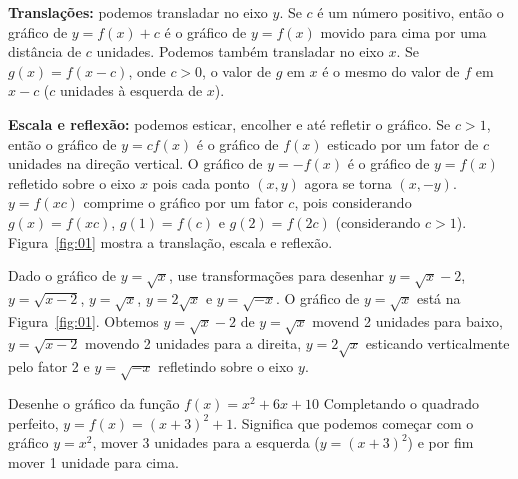 \textbf{Translações:} podemos transladar no eixo $y$. Se $c$ é um número positivo, então o gráfico de $y=f(x)+c$ é o gráfico de $y=f(x)$ movido para cima por uma distância de $c$ unidades. Podemos também transladar no eixo $x$. Se $g(x) = f(x-c)$, onde $c>0$, o valor de $g$ em $x$ é o mesmo do valor de $f$ em $x-c$ ($c$ unidades à esquerda de $x$).

\noindent\textbf{Escala e reflexão:} podemos esticar, encolher e até refletir o gráfico. Se $c > 1$, então o gráfico de $y=cf(x)$ é o gráfico de $f(x)$ esticado por um fator de $c$ unidades na direção vertical. O gráfico de $y=-f(x)$ é o gráfico de $y=f(x)$ refletido sobre o eixo $x$ pois cada ponto $(x,y)$ agora se torna $(x,-y)$. $y=f(xc)$ comprime o gráfico por um fator $c$, pois considerando $g(x) = f(xc)$, $g(1)=f(c)$ e $g(2)=f(2c)$ (considerando $c>1$). Figura~\ref{fig:01} mostra a translação, escala e reflexão.

\vspace{-0.5cm}\begin{figure}[!ht]
	\centering
\caption{}\label{fig:transforming-functions}
\end{figure}\vspace{-0.5cm}

 Dado o gráfico de $y=\sqrt{x}$, use transformações para desenhar $y=\sqrt{x}-2$, $y=\sqrt{x-2}$, $y=\sqrt{x}$, $y=2\sqrt{x}$ e $y=\sqrt{-x}$.
\solution O gráfico de $y=\sqrt{x}$ está na Figura~\ref{fig:01}. Obtemos $y=\sqrt{x}-2$ de $y=\sqrt{x}$ movend 2 unidades para baixo, $y=\sqrt{x-2}$ movendo 2 unidades para a direita, $y=2\sqrt{x}$ esticando verticalmente pelo fator 2 e $y=\sqrt{-x}$ refletindo sobre o eixo $y$.

\vspace{-0.5cm}\begin{figure}[!ht]
	\centering
	\caption{}\label{fig:transforming-functions-example1}
\end{figure}\vspace{-0.5cm}

\exampleEnd

 Desenhe o gráfico da função $f(x) = x^2 + 6x + 10$
\solution Completando o quadrado perfeito, $y=f(x)=(x+3)^2+1$. Significa que podemos começar com o gráfico $y=x^2$, mover 3 unidades para a esquerda ($y=(x+3)^2$) e por fim mover 1 unidade para cima.

